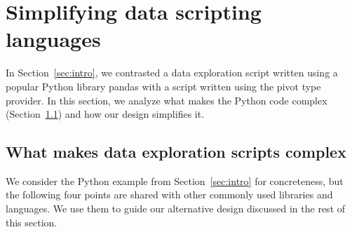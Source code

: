 \documentclass[a4paper,UKenglish]{lipics-v2016}
\theoremstyle{plain}
\theoremstyle{definition}
\begin{document}

\section{Simplifying data scripting languages}
\label{sec:analysis}

In Section~\ref{sec:intro}, we contrasted a data exploration script written using a popular Python 
library pandas with a script written using the pivot type provider. In this section, we analyze 
what makes the Python code complex (Section~\ref{sec:analysis-why}) and how our design simplifies it.

\subsection{What makes data exploration scripts complex}
\label{sec:analysis-why}

We consider the Python example from Section~\ref{sec:intro} for concreteness, but the following 
four points are shared with other commonly used libraries and languages. We use them to guide our
alternative design discussed in the rest of this section.
\end{document}
